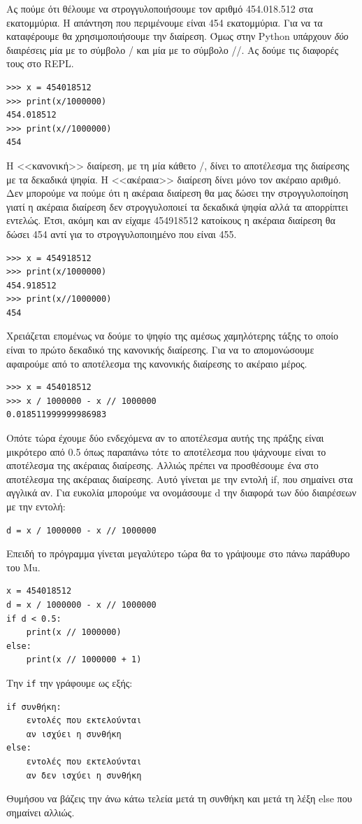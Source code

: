 Ας πούμε ότι θέλουμε να στρογγυλοποιήσουμε τον αριθμό 454.018.512 στα εκατομμύρια. Η απάντηση που περιμένουμε είναι 454 εκατομμύρια.
Για να τα καταφέρουμε θα χρησιμοποιήσουμε την διαίρεση. Όμως στην Python υπάρχουν \emph{δύο} διαιρέσεις μία με το σύμβολο / και μία με το σύμβολο //. Ας δούμε τις διαφορές τους στο REPL.
\begin{lstlisting}
>>> x = 454018512
>>> print(x/1000000)
454.018512
>>> print(x//1000000)
454
\end{lstlisting}
Η <<κανονική>> διαίρεση, με τη μία κάθετο /, δίνει το αποτέλεσμα της διαίρεσης με τα δεκαδικά ψηφία. Η <<ακέραια>> διαίρεση δίνει μόνο τον ακέραιο αριθμό. Δεν μπορούμε να πούμε ότι η ακέραια διαίρεση θα μας δώσει την στρογγυλοποίηση γιατί η ακέραια διαίρεση δεν στρογγυλοποιεί τα δεκαδικά ψηφία αλλά τα απορρίπτει εντελώς. Έτσι, ακόμη και αν είχαμε 454918512 κατοίκους η ακέραια διαίρεση θα δώσει 454 αντί για το στρογγυλοποιημένο που είναι 455.
\begin{lstlisting}
>>> x = 454918512
>>> print(x/1000000)
454.918512
>>> print(x//1000000)
454
\end{lstlisting}

Χρειάζεται επομένως να δούμε το ψηφίο της αμέσως χαμηλότερης τάξης το οποίο είναι το πρώτο δεκαδικό της κανονικής διαίρεσης. Για να το απομονώσουμε αφαιρούμε από το αποτέλεσμα της κανονικής διαίρεσης το ακέραιο μέρος.
\begin{lstlisting}
>>> x = 454018512
>>> x / 1000000 - x // 1000000
0.018511999999986983
\end{lstlisting}
Οπότε τώρα έχουμε δύο ενδεχόμενα αν το αποτέλεσμα αυτής της πράξης είναι μικρότερο από 0.5 όπως παραπάνω τότε το αποτέλεσμα που ψάχνουμε είναι το αποτέλεσμα της ακέραιας διαίρεσης. Αλλιώς πρέπει να προσθέσουμε ένα στο αποτέλεσμα της ακέραιας διαίρεσης.
Αυτό γίνεται με την εντολή if, που σημαίνει στα αγγλικά αν. Για ευκολία μπορούμε να ονομάσουμε d την διαφορά των δύο διαιρέσεων με την εντολή:
\begin{lstlisting}
d = x / 1000000 - x // 1000000
\end{lstlisting}
Επειδή το πρόγραμμα γίνεται μεγαλύτερο τώρα θα το γράψουμε στο πάνω παράθυρο του Mu.
\begin{lstlisting}
x = 454018512
d = x / 1000000 - x // 1000000
if d < 0.5:
    print(x // 1000000)
else:
    print(x // 1000000 + 1)
\end{lstlisting}
Την \lstinline{if} την γράφουμε ως εξής:
\begin{lstlisting}
if συνθήκη:
    εντολές που εκτελούνται
    αν ισχύει η συνθήκη
else:
    εντολές που εκτελούνται
    αν δεν ισχύει η συνθήκη
\end{lstlisting}
Θυμήσου να βάζεις την άνω κάτω τελεία μετά τη συνθήκη και μετά τη λέξη else που σημαίνει αλλιώς.

